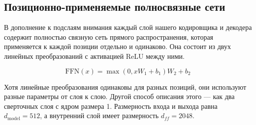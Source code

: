 \documentclass{article}
\newcommand{\kq}{q}
\newcommand{\km}{k}
\newcommand{\vq}{o}
\newcommand{\vm}{m}
\newcommand{\Wkq}{W_q}
\newcommand{\Wkm}{W_k}
\newcommand{\Wvq}{W_o}
\newcommand{\Wvm}{W_m}
\newcommand{\dmodel}{d_{\text{model}}}
\begin{document}
\subsection{Позиционно-применяемые полносвязные сети}\label{sec:ffn}

В дополнение к подслаям внимания каждый слой нашего кодировщика и декодера содержит полностью связную сеть прямого распространения, которая применяется к каждой позиции отдельно и одинаково. Она состоит из двух линейных преобразований с активацией ReLU между ними.

\begin{equation}
   \mathrm{FFN}(x)=\max(0, xW_1 + b_1) W_2 + b_2
\end{equation}

Хотя линейные преобразования одинаковы для разных позиций, они используют разные параметры от слоя к слою. Другой способ описания этого — как два сверточных слоя с ядром размера 1. Размерность входа и выхода равна $\dmodel=512$, а внутренний слой имеет размерность $d_{ff}=2048$.



\end{document}
